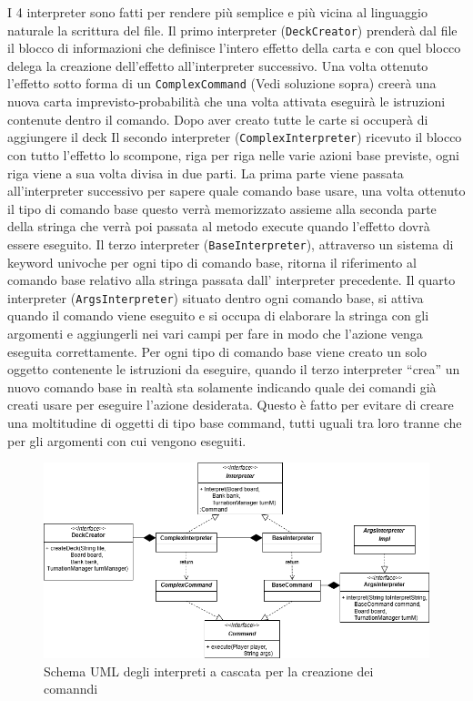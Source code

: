 I 4 interpreter sono fatti per rendere più semplice e più vicina al linguaggio naturale la scrittura del file. 
Il primo interpreter (\texttt{DeckCreator}) prenderà dal file il blocco di informazioni che definisce l’intero effetto della carta e con quel blocco delega la creazione dell’effetto all’interpreter successivo. Una volta ottenuto l’effetto sotto forma di un \texttt{ComplexCommand} (Vedi soluzione sopra) creerà una nuova carta imprevisto-probabilità che una volta attivata eseguirà le istruzioni contenute dentro il comando. Dopo aver creato tutte le carte si occuperà di aggiungere il deck
Il secondo interpreter (\texttt{ComplexInterpreter}) ricevuto il blocco con tutto l’effetto lo scompone, riga per riga nelle varie azioni base previste, ogni riga viene a sua volta divisa in due parti. 
La prima parte viene passata all’interpreter successivo per sapere quale comando base usare, una volta ottenuto il tipo di comando base questo verrà memorizzato assieme alla seconda parte della stringa che verrà poi passata al metodo execute quando l’effetto dovrà essere eseguito.  
Il terzo interpreter (\texttt{BaseInterpreter}), attraverso un sistema di keyword univoche per ogni tipo di comando base, ritorna il riferimento al comando base relativo alla stringa passata dall’ interpreter precedente.
Il quarto interpreter (\texttt{ArgsInterpreter}) situato dentro ogni comando base, si attiva quando il comando viene eseguito e si occupa di elaborare la stringa con gli argomenti e aggiungerli nei vari campi per fare in modo che l’azione venga eseguita correttamente.
Per ogni tipo di comando base viene creato un solo oggetto contenente le istruzioni da eseguire, quando il terzo interpreter “crea” un nuovo comando base in realtà sta solamente indicando quale dei comandi già creati usare per eseguire l’azione desiderata.
Questo è fatto per evitare di creare una moltitudine di oggetti di tipo base command, tutti uguali tra loro tranne che per gli argomenti con cui vengono eseguiti.
\begin{figure}[h]
    \centering
    \includegraphics[width=1\linewidth]{img/martina/interpretersUML.png}
    \caption{Schema UML degli interpreti a cascata per la creazione dei comanndi}
    \label{img:interpretersUML}
\end{figure}
